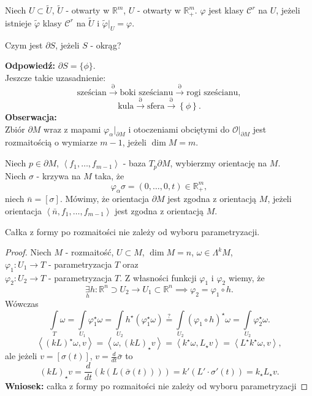 \documentclass[../main.tex]{subfiles}
\begin{document}
\begin{definicja}
    Niech $U\subset \tilde U$, $\tilde U$ - otwarty w $\mathbb{R}^m$, $U$ - otwarty w $\mathbb{R}^m_+$. $\varphi$ jest klasy $\mathcal{C}^r$ na $U$, jeżeli istnieje $\tilde \varphi$ klasy $\mathcal{C}^r$ na $\tilde U$ i $\tilde \varphi|_U = \varphi$.
\end{definicja}
\begin{pytanie}
    Czym jest $\partial S$, jeżeli $S$ - okrąg?
\end{pytanie}
\textbf{Odpowiedź:} $\partial S = \{\phi\}$.\\
Jeszcze takie uzasadnienie:
\[
    \text{sześcian} \overset{\partial}{\to} \text{boki sześcianu} \overset{\partial}{\to} \text{rogi sześcianu}
,\]
\[
    \text{kula} \overset{\partial}{\to} \text{sfera} \overset{\partial}{\to} \left\{ \phi \right\}
.\]
\textbf{Obserwacja:}\\
Zbiór $\partial M$ wraz z mapami $\varphi_\alpha|_{\partial M}$ i otoczeniami obciętymi do $\mathcal{O}|_{\partial M}$ jest rozmaitością o wymiarze $m-1$, jeżeli $\dim M = m$.\\

\pagebreak
\begin{definicja}
Niech  $p\in \partial M$, $\left<f_1,\ldots,f_{m-1} \right>$ - baza $ T_p\partial M$, wybierzmy orientację na $M$.\\
Niech $\sigma$ - krzywa na $M$ taka, że
\[
    \varphi_\alpha\sigma =  \left( 0,\ldots,0,t \right) \in\mathbb{R}^m_+
,\]
niech $\bar{n} = \left[ \sigma \right] $. Mówimy, że orientacja $\partial M$ jest zgodna z orientacją $M$, jeżeli orientacja $\left<\bar{n}, f_1,\ldots,f_{m-1} \right>$ jest zgodna z orientacją $M$.
\end{definicja}

\begin{stw}
    Całka z formy po rozmaitości nie zależy od wyboru parametryzacji.
\end{stw}
\begin{proof}
Niech $M$ - rozmaitość, $U\subset M$, $\dim M = n$, $\omega\in \Lambda^kM$,\\
    $\varphi_1: U_1\to T$ - parametryzacja $T$ oraz \\
    $\varphi_2: U_2\to T$ - parametryzacja $T$. Z własności funkcji  $\varphi_1$ i $\varphi_2$ wiemy, że
\[
\underset{h}{\exists} h: \mathbb{R}^n \supset U_2\to U_1\subset\mathbb{R}^n \implies \varphi_2 = \varphi_1\circ h
.\]
Wówczas
\[
    \int\limits_{T}\omega = \int\limits_{U_1}\varphi_1^\star \omega = \int\limits_{U_2}h^\star\left( \varphi_1^\star\omega \right) \overset{\text{?}}{=} \int\limits_{U_2}(\varphi_1\circ h)^\star\omega = \int\limits_{U_2}\varphi_2^\star\omega
.\]
    \[
        \left<(kL)^\star\omega, v \right> = \left<\omega, (kL)_\star v \right> = \left<k^\star \omega, L_\star v \right> = \left<L^\star k^\star \omega, v \right>
    ,\]
ale jeżeli $v = \left[ \sigma(t) \right]$, $v = \frac{d}{dt}\bar{\sigma}$ to
\[
    (kL)_\star v = \frac{d}{dt}\left( k\left( L\left( \bar{\sigma}(t) \right)  \right)  \right) = k'(L'\cdot \sigma'(t)) = k_\star L_\star v
.\]
\textbf{Wniosek:} całka z formy po rozmaitości nie zależy od wyboru parametryzacji
\end{proof}
\end{document}
